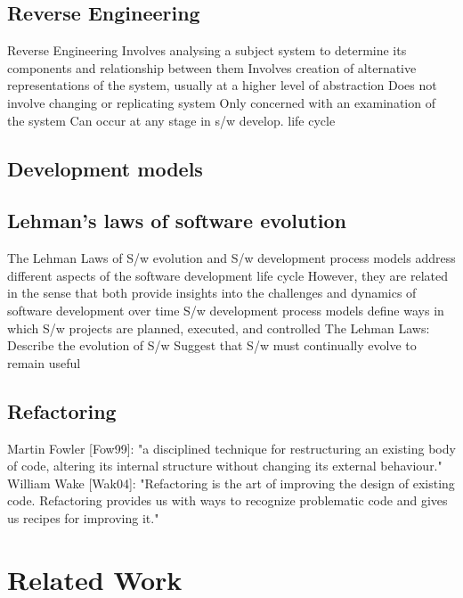 \subsection{Reverse Engineering}
\label{sec:Development models}

Reverse Engineering
 Involves analysing a subject system to determine its
components and relationship between them
 Involves creation of alternative representations of the
system, usually at a higher level of abstraction
 Does not involve changing or replicating system
 Only concerned with an examination of the system
 Can occur at any stage in s/w develop. life cycle

\subsection{Development models}
\label{sec:Development models}

\subsection{Lehman’s laws of software evolution}
\label{sec:Lehman}

The Lehman Laws of S/w evolution and S/w
development process models address different aspects
of the software development life cycle
 However, they are related in the sense that both
provide insights into the challenges and dynamics of
software development over time
 S/w development process models define ways in which
S/w projects are planned, executed, and controlled
 The Lehman Laws:
 Describe the evolution of S/w
 Suggest that S/w must continually evolve to remain useful

\subsection{Refactoring}
\label{sec:Refactoring}

\cite{fowler2018refactoring}
Martin Fowler [Fow99]: "a disciplined technique for restructuring an existing body of code, altering its internal structure without changing its external behaviour." William Wake [Wak04]: "Refactoring is the art of improving the design of existing code. Refactoring provides us with ways to recognize problematic code and gives us recipes for improving it."


\section{Related Work}
\label{sec:Template}
